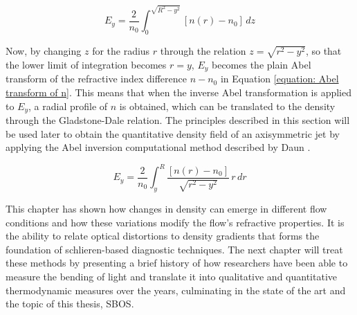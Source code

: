 \begin{equation}
\label{equation: integral of epsilon}
    E_y = \frac{2}{n_0}\int_0^{\sqrt{R^2 - y^2}} [n(r) - n_0]\,dz
\end{equation}

\par Now, by changing $z$ for the radius $r$ through the relation $z = \sqrt{r^2 - y^2}$, so that the lower limit of integration becomes $r = y$, $E_y$ becomes the plain Abel transform of the refractive index difference $n - n_0$ in Equation \ref{equation: Abel transform of n}. This means that when the inverse Abel transformation is applied to $E_y$, a radial profile of $n$ is obtained, which can be translated to the density through the Gladstone-Dale relation. The principles described in this section will be used later to obtain the quantitative density field of an axisymmetric jet by applying the Abel inversion computational method described by Daun \cite{Daun2006}.

\begin{equation}
    \label{equation: Abel transform of n}
    E_y = \frac{2}{n_0} \int_y^R \frac{[n(r) - n_0]}{\sqrt{r^2-y^2}}\,r\,dr
\end{equation}

\par This chapter has shown how changes in density can emerge in different flow conditions and how these variations modify the flow's refractive properties. It is the ability to relate optical distortions to density gradients that forms the foundation of schlieren-based diagnostic techniques. The next chapter will treat these methods by presenting a brief history of how researchers have been able to measure the bending of light and translate it into qualitative and quantitative thermodynamic measures over the years, culminating in the state of the art and the topic of this thesis, SBOS.